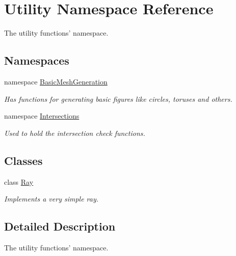 \hypertarget{namespace_utility}{\section{Utility Namespace Reference}
\label{namespace_utility}
}


The utility functions' namespace.  


\subsection*{Namespaces}
\begin{DoxyCompactItemize}
\item 
namespace \hyperlink{namespace_utility_1_1_basic_mesh_generation}{Basic\-Mesh\-Generation}
\begin{DoxyCompactList}\small\item\em Has functions for generating basic figures like circles, toruses and others. \end{DoxyCompactList}\item 
namespace \hyperlink{namespace_utility_1_1_intersections}{Intersections}
\begin{DoxyCompactList}\small\item\em Used to hold the intersection check functions. \end{DoxyCompactList}\end{DoxyCompactItemize}
\subsection*{Classes}
\begin{DoxyCompactItemize}
\item 
class \hyperlink{class_utility_1_1_ray}{Ray}
\begin{DoxyCompactList}\small\item\em Implements a very simple ray. \end{DoxyCompactList}\end{DoxyCompactItemize}


\subsection{Detailed Description}
The utility functions' namespace. 